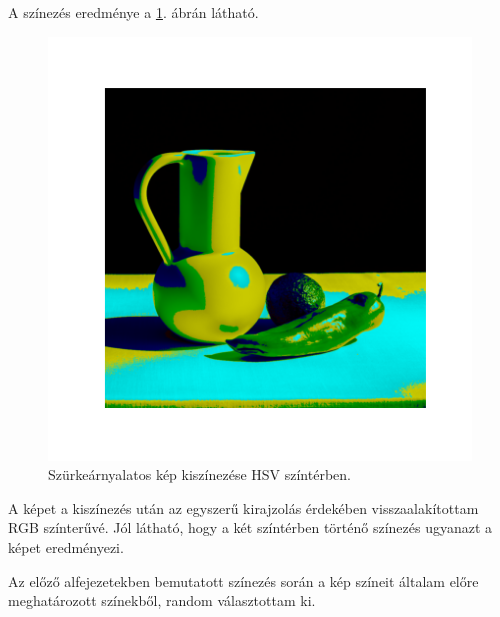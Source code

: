 A színezés eredménye a \ref{fig:colorized_hsv}. ábrán látható.

\begin{figure}[h]
\centering
\includegraphics[scale=0.7]{images/colorized_hsv.png}
\caption{Szürkeárnyalatos kép kiszínezése HSV színtérben.}
\label{fig:colorized_hsv}
\end{figure}

A képet a kiszínezés után az egyszerű kirajzolás érdekében visszaalakítottam RGB színterűvé. Jól látható, hogy a két színtérben történő színezés ugyanazt a képet eredményezi.


Az előző alfejezetekben bemutatott színezés során a kép színeit általam előre meghatározott színekből, random választottam ki.